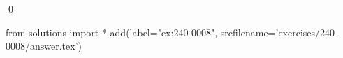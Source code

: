 
\begin{ex} 
  \label{ex:240-0008}
  
  \qed
\end{ex} 
\begin{python0}
from solutions import *
add(label="ex:240-0008",
    srcfilename='exercises/240-0008/answer.tex') 
\end{python0}
